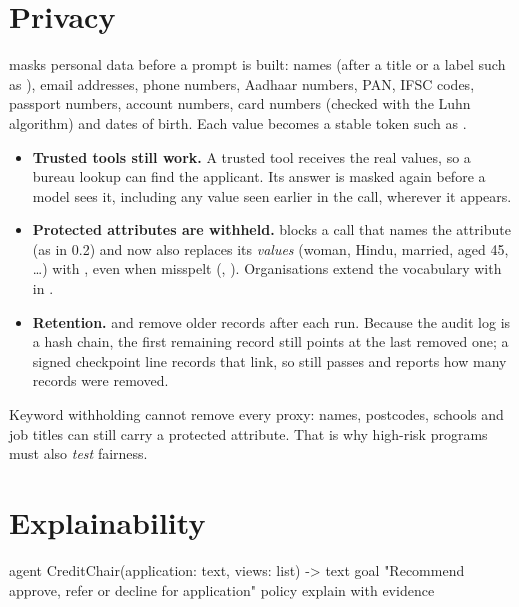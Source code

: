 \section{Privacy}

 masks personal data before a prompt is built: names (after a title or a label such as ), email addresses, phone numbers, Aadhaar numbers, PAN, IFSC codes, passport numbers, account numbers, card numbers (checked with the Luhn algorithm) and dates of birth. Each value becomes a stable token such as .

\begin{itemize}
\item \textbf{Trusted tools still work.} A trusted tool receives the real values, so a bureau lookup can find the applicant. Its answer is masked again before a model sees it, including any value seen earlier in the call, wherever it appears.
\item \textbf{Protected attributes are withheld.}  blocks a call that names the attribute (as in 0.2) and now also replaces its \emph{values} (woman, Hindu, married, aged 45, \ldots) with \code{[withheld]}, even when misspelt (, ). Organisations extend the vocabulary with  in .
\item \textbf{Retention.}  and  remove older records after each run. Because the audit log is a hash chain, the first remaining record still points at the last removed one; a signed checkpoint line records that link, so  still passes and reports how many records were removed.
\end{itemize}

\begin{caution}
Keyword withholding cannot remove every proxy: names, postcodes, schools and job titles can still carry a protected attribute. That is why high-risk programs must also \emph{test} fairness.
\end{caution}

\section{Explainability}

\begin{algo}[title=Reasons that must be real]
agent CreditChair(application: text, views: list) -> text {
    goal   "Recommend approve, refer or decline for {application}"
    policy { explain with evidence }
}
\end{algo}

